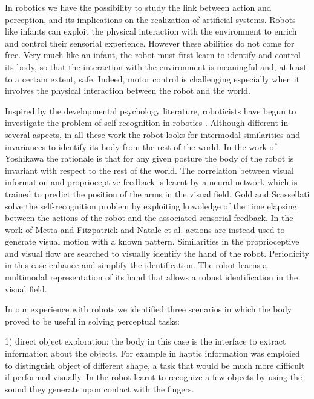 In robotics we have the possibility to study the link between action and perception, and its implications on the realization of artificial systems. Robots like infants can exploit the physical interaction with the environment to enrich and control their sensorial experience. However these abilities do not come for free. Very much like an infant, the robot must first learn to identify and control its body, so that the interaction with the environment is meaningful and, at least to a certain extent, safe. Indeed, motor control is challenging especially when it involves the physical interaction between the robot and the world. 

Inspired by the developmental psychology literature, roboticists have begun to investigate the problem of self-recognition in robotics \cite{yoshikawa03doestheinvariance,metta03early,natale05exploring,gold05learning}. Although different in several aspects, in all these work the robot looks for intermodal similarities and invariances to identify its body from the rest of the world.
In the work of Yoshikawa \cite{yoshikawa03doestheinvariance} the rationale is that for any given posture the body of the robot is invariant with respect to the rest of the world. The correlation between visual information and proprioceptive feedback is learnt by a neural network which is trained to predict the position of the arms in the visual field.
Gold and Scassellati \cite{gold05learning} solve the self-recognition problem by exploiting knwoledge of the time elapsing between the actions of the robot and the associated sensorial feedback.
In the work of Metta and Fitzpatrick \cite{metta03early} and Natale et al. \cite{natale05exploring} actions are instead used to generate visual motion with a known pattern. Similarities in the proprioceptive and visual flow are searched to visually identify the hand of the robot. Periodicity in this case enhance and simplify the identification. The robot learns a multimodal representation of its hand that allows a robust identification in the visual field.

In our experience with robots we identified three scenarios in which the body proved to be useful in solving perceptual tasks:

1) direct object exploration: the body in this case is the interface to extract information about the objects. For example in \cite{natale04learning} haptic information was emploied to distinguish object of different shape, a task that would be much more difficult if performed visually. In \cite{torres-jara05tapping} the robot learnt to recognize a few objects by using the sound they generate upon contact with the fingers.

